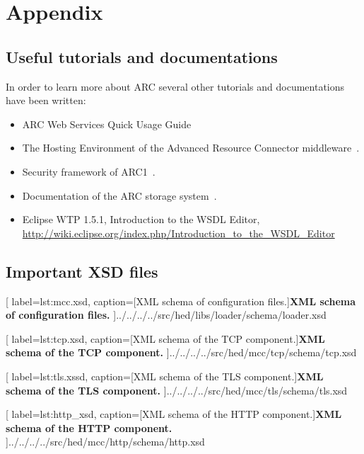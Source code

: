 \chapter{Appendix}

\section{Useful tutorials and documentations}

In order to learn more about ARC several other tutorials and documentations have been written:
\begin{itemize}
 \item ARC Web Services Quick Usage Guide~\cite{2008_UNKNOWN}
 \item The Hosting Environment of the Advanced Resource Connector middleware~\cite{2008_Cameron}.
 \item Security framework of ARC1~\cite{QIANG_2008}.
 \item Documentation of the ARC storage system~\cite{Nagy_2008}.
 \item Eclipse WTP 1.5.1, Introduction to the WSDL Editor, \url{http://wiki.eclipse.org/index.php/Introduction_to_the_WSDL_Editor}


\end{itemize}




\section{Important XSD files}\label{sec:impXSD}


	[
	label=lst:mcc.xsd,
	caption={[XML schema of configuration files.]\textbf{XML schema of configuration files.}}
	]{../../../../src/hed/libs/loader/schema/loader.xsd}


	[
	label=lst:tcp.xsd,
	caption={[XML schema of the TCP component.]\textbf{XML schema of the TCP component.}}
	]{../../../../src/hed/mcc/tcp/schema/tcp.xsd}


	[
	label=lst:tls.xssd,
	caption={[XML schema of the TLS component.]\textbf{XML schema of  the TLS component.}}
	]{../../../../src/hed/mcc/tls/schema/tls.xsd}


	[
	label=lst:http_xsd,
	caption={[XML schema of the HTTP component.]\textbf{XML schema of the HTTP component.}}
	]{../../../../src/hed/mcc/http/schema/http.xsd}









